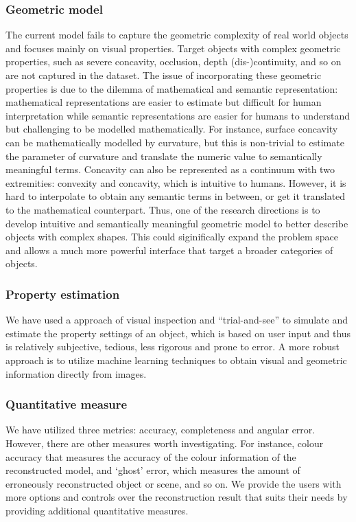 \subsubsection{Geometric model}
The current model fails to capture the geometric complexity of real world objects and focuses mainly on visual properties. Target objects with complex geometric properties, such as severe concavity, occlusion, depth (dis-)continuity, and so on are not captured in the dataset. The issue of incorporating these geometric properties is due to the dilemma of mathematical and semantic representation: mathematical representations are easier to estimate but difficult for human interpretation while semantic representations are easier for humans to understand but challenging to be modelled mathematically. For instance, surface concavity can be mathematically modelled by curvature, but this is non-trivial to estimate the parameter of curvature and translate the numeric value to semantically meaningful terms. Concavity can also be represented as a continuum with two extremities: convexity and concavity, which is intuitive to humans. However, it is hard to interpolate to obtain any semantic terms in between, or get it translated to the mathematical counterpart. Thus, one of the research directions is to develop intuitive and semantically meaningful geometric model to better describe objects with complex shapes. This could siginifically expand the problem space and allows a much more powerful interface that target a broader categories of objects.

\subsubsection{Property estimation}
We have used a approach of visual inspection and ``trial-and-see'' to simulate and estimate the property settings of an object, which is based on user input and thus is relatively subjective, tedious, less rigorous and prone to error. A more robust approach is to utilize machine learning techniques to obtain visual and geometric information directly from images.

\subsubsection{Quantitative measure}
We have utilized three metrics: accuracy, completeness and angular error. However, there are other measures worth investigating. For instance, colour accuracy that measures the accuracy of the colour information of the reconstructed model, and `ghost' error, which measures the amount of erroneously reconstructed object or scene, and so on. We provide the users with more options and controls over the reconstruction result that suits their needs by providing additional quantitative measures.

